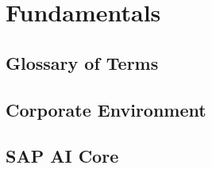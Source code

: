 \chapter{Fundamentals}
\section{Glossary of Terms}

\section{Corporate Environment}
\section{SAP AI Core}

